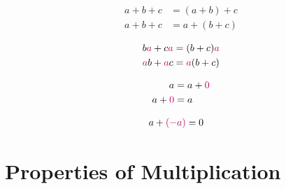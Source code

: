 \documentclass[20150903-160354-rs2.2-MarksMathNotebook.tex]{subfiles}
\begin{document}
\begin{property}
\begin{subequations}
\begin{align}
a+b+c &= (a+b)+c \label{eq:apa1} \\
a+b+c &= a+(b+c) \label{eq:apa2}
\end{align}
\end{subequations}
\end{property}

\begin{property}
\begin{subequations}
\begin{align}
b\alert{a} + c\alert{a} &= (b+c)\alert{a} \label{eq:dpf1} \\
\alert{a}b + \alert{a}c &= \alert{a}(b+c) \label{eq:dpf2}
\end{align}
\end{subequations}
\end{property}

\begin{property}
\begin{subequations}
\begin{align}
a &= a+\alert{0} \label{eq:aid1} \\
a+\alert{0} &= a  \label{eq:aid2}
\end{align}
\end{subequations}
\end{property}

\begin{property}
\begin{subequations}
\begin{align}
a + \alert{(-a)} &= 0 \label{eq:ai}
\end{align}
\end{subequations}
\end{property}



\section{Properties of Multiplication}
\end{document}
